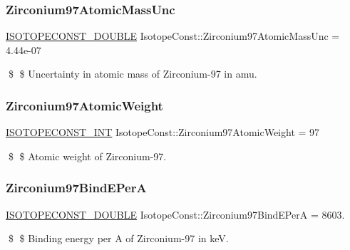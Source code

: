 \subsubsection{\texorpdfstring{Zirconium97\+Atomic\+Mass\+Unc}{Zirconium97AtomicMassUnc}}
{\footnotesize\ttfamily \mbox{\hyperlink{group___isotope_const-_macros_ga8f45a7272ce02c0b4c65c44636ed719a}{I\+S\+O\+T\+O\+P\+E\+C\+O\+N\+S\+T\+\_\+\+D\+O\+U\+B\+LE}} Isotope\+Const\+::\+Zirconium97\+Atomic\+Mass\+Unc = 4.\+44e-\/07}

\$ \$ Uncertainty in atomic mass of Zirconium-\/97 in amu. \mbox{\label{group___isotope_const-_zirconium-_zr97_ga1f8bb1a8e64117d91d0b0f5e2495cdd6}} 
\subsubsection{\texorpdfstring{Zirconium97\+Atomic\+Weight}{Zirconium97AtomicWeight}}
{\footnotesize\ttfamily \mbox{\hyperlink{group___isotope_const-_macros_ga5f18360b3e99483a35c32d789e62621c}{I\+S\+O\+T\+O\+P\+E\+C\+O\+N\+S\+T\+\_\+\+I\+NT}} Isotope\+Const\+::\+Zirconium97\+Atomic\+Weight = 97}

\$ \$ Atomic weight of Zirconium-\/97. \mbox{\label{group___isotope_const-_zirconium-_zr97_ga0c8da1eb2c12b4e65a66923116746c7b}} 
\subsubsection{\texorpdfstring{Zirconium97\+Bind\+E\+PerA}{Zirconium97BindEPerA}}
{\footnotesize\ttfamily \mbox{\hyperlink{group___isotope_const-_macros_ga8f45a7272ce02c0b4c65c44636ed719a}{I\+S\+O\+T\+O\+P\+E\+C\+O\+N\+S\+T\+\_\+\+D\+O\+U\+B\+LE}} Isotope\+Const\+::\+Zirconium97\+Bind\+E\+PerA = 8603.}

\$ \$ Binding energy per A of Zirconium-\/97 in keV. \mbox{\label{group___isotope_const-_zirconium-_zr97_ga4cab043a49d376b7a4b9d2be0797d036}} 

